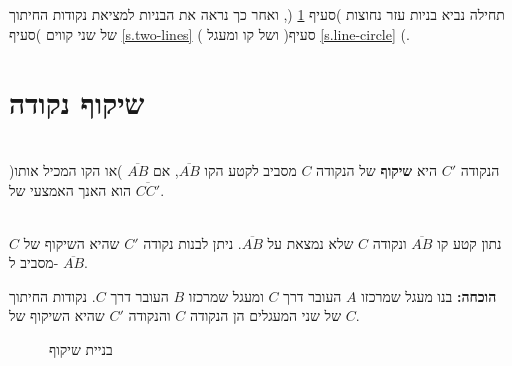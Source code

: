 תחילה נביא בניות עזר נחוצות )סעיף
\ref{s.auxiliary}%
(,
ואחר כך נראה את הבניות למציאת נקודות החיתוך של שני קווים )סעיף
\ref{s.two-lines}%
( ושל קו ומעגל )סעיף
\ref{s.line-circle}%
(.

\section{שיקוף נקודה}\label{s.auxiliary}

\begin{definition}\mbox{}\\
הנקודה
$C'$
היא
\textbf{%
שיקוף%
}
של הנקודה
$C$
מסביב לקטע הקו
$\overline{AB}$,
אם 
$\overline{AB}$
)או הקו המכיל אותו( הוא האנך האמצעי של
$\overline{CC'}$.
\end{definition}



\begin{theorem}\mbox{}\label{thm.reflection}\\
נתון קטע קו
$\overline{AB}$
ונקודה 
$C$
שלא נמצאת על
$\overline{AB}$.
ניתן לבנות נקודה 
$C'$
שהיא השיקוף של
$C$
מסביב ל-%
$\overline{AB}$.
\end{theorem}

\textbf{הוכחה:}
בנו מעגל שמרכזו
$A$
העובר דרך
$C$
ומעגל שמרכזו
$B$
העובר דרך
$C$.
נקודות החיתוך של שני המעגלים הן הנקודה
$C$
והנקודה
$C'$
שהיא השיקוף של
$C$.


\begin{figure}[htb]
\begin{center}
\caption{בניית שיקוף}\label{}
\end{center}
\end{figure}

